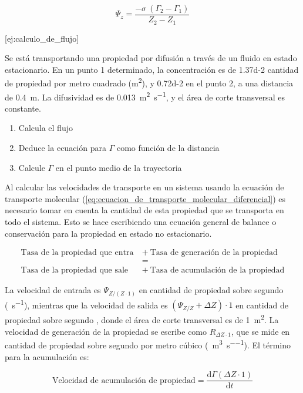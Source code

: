 \documentclass{AsignaturaResumen}
\begin{document}
\begin{equation}
    \Psi_{z} = \frac{-\sigma \ (\Gamma_{2} - \Gamma_{1})}{Z_{2} - Z_{1}}
\end{equation}

[ej:calculo_de_flujo]{
    Se está transportando una propiedad por difusión a través de un fluido en estado estacionario. En un punto 1 determinado, la concentración es de \num{1.37d-2} cantidad de propiedad por metro cuadrado (\unit{\meter\squared}), y \num{0.72d-2} en el punto 2, a una distancia de \qty{0.4}{\m}. La difusividad es de \qty{0.013}{\m\squared\per\s}, y el área de corte transversal es constante.
    \begin{enumerate}
        \item Calcula el flujo
        \item Deduce la ecuación para $\Gamma$ como función de la distancia
        \item Calcule $\Gamma$ en el punto medio de la trayectoria
    \end{enumerate}
}

Al calcular las velocidades de transporte en un sistema usando la ecuación de transporte molecular (\autoref{eq:ecuacion_de_transporte_molecular_diferencial}) es necesario tomar en cuenta la cantidad de esta propiedad que se transporta en todo el sistema. Esto se hace escribiendo una ecuación general de balance o conservación para la propiedad en estado no estacionario.

\begin{align*}
    \text{Tasa de la propiedad que entra} \ &+ \ \text{Tasa de generación de la propiedad}
    \\
    &=
    \\
    \text{Tasa de la propiedad que sale} \ &+ \ \text{Tasa de acumulación de la propiedad}
\end{align*}

La velocidad de entrada es $\Psi_{Z / (Z \cdot 1)}$ en cantidad de propiedad sobre segundo (\unit{\substance\per\s}), mientras que la velocidad de salida es $(\Psi_{Z/Z} + \Delta Z) \cdot 1$ en cantidad de propiedad sobre segundo , donde el área de corte transversal es de \qty{1}{\m\squared}. La velocidad de generación de la propiedad se escribe como $R_{\Delta Z \cdot 1}$, que se mide en cantidad de propiedad sobre segundo por metro cúbico (\unit{\substance\per\m\cubed\per\s}). El término para la acumulación es:

\begin{equation}
    \text{Velocidad de acumulación de propiedad} = \frac{\mathrm{d}\Gamma (\Delta Z \cdot 1)}{\mathrm{d}t} 
\end{equation}
\end{document}
